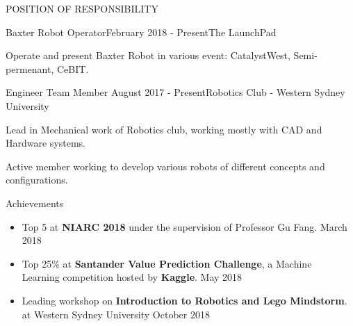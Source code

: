 \documentclass{resume} %
\begin{document}

 
  
\begin{rSection}{POSITION OF RESPONSIBILITY}

\begin{rSubsection}{Baxter Robot Operator}{February 2018 - Present}{The LaunchPad}{}              
\item Operate and present Baxter Robot in various event: CatalystWest, Semi-permenant, CeBIT.
\end{rSubsection}  


\begin{rSubsection}{Engineer Team Member} {August 2017 - Present}{Robotics Club - Western Sydney University}{} 
\item Lead in Mechanical work of Robotics club, working mostly with CAD and Hardware systems.
\item Active member working to develop various robots of different concepts and configurations.    
\end{rSubsection}

\end{rSection}
  


\begin{rSection}{Achievements} \itemsep -2pt   

\begin{itemize}
 
\item \faTrophy \hspace{0.1cm} Top 5 at \textbf{NIARC 2018} under the supervision of Professor Gu Fang. \hfill March 2018 
\item \faTrophy \hspace{0.1cm} Top 25\% at \textbf{Santander Value Prediction Challenge}, a Machine
\\Learning competition hosted by \textbf{Kaggle}.   \hfill May 2018  
\item Leading workshop on \textbf{Introduction to Robotics and Lego Mindstorm}.
\\at Western Sydney University \hfill October 2018 
  
\end{itemize}  


\end{rSection} 

\end{document}
